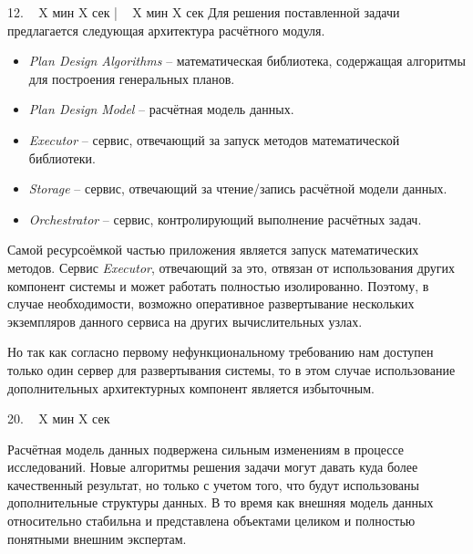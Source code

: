 \documentclass[a4paper,14pt]{extarticle}
\begin{document}
    12. ~ X мин X сек | ~ X мин X сек
    Для решения поставленной задачи предлагается следующая архитектура расчётного модуля. 
    \begin{itemize}
        \item \textit{Plan Design Algorithms} -- математическая библиотека, содержащая алгоритмы
        для построения генеральных планов.
        \item \textit{Plan Design Model} -- расчётная модель данных.
        \item \textit{Executor} -- сервис, отвечающий за запуск методов математической библиотеки.
        \item \textit{Storage} -- сервис, отвечающий за чтение/запись расчётной модели данных.
        \item \textit{Orchestrator} -- сервис, контролирующий выполнение расчётных задач.

    \end{itemize}

    Самой ресурсоёмкой частью приложения является запуск математических методов.
    Сервис \textit{Executor}, отвечающий за это, отвязан от использования других компонент системы
    и может работать полностью изолированно.
    Поэтому, в случае необходимости, возможно оперативное развертывание нескольких экземпляров данного сервиса
    на других вычислительных узлах.

    Но так как согласно первому нефункциональному требованию нам доступен только один сервер для развертывания
    системы, то в этом случае использование дополнительных архитектурных компонент является избыточным.

    20. ~ X мин X сек

    Расчётная модель данных подвержена сильным изменениям в процессе исследований.
    Новые алгоритмы решения задачи могут давать куда более качественный результат, но только с учетом того, что
    будут использованы дополнительные структуры данных. В то время как внешняя модель данных относительно стабильна
    и представлена объектами целиком и полностью понятными внешним экспертам.
\end{document}
